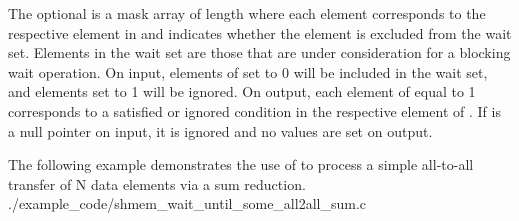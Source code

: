 \begin{apidefinition}
{    The optional  is a mask array of length  where each
    element corresponds to the respective element in  and indicates
    whether the element is excluded from the wait set.  Elements in the wait
    set are those that are under consideration for a blocking wait operation.
    On input, elements of  set to 0 will be included in the wait
    set, and elements set to 1 will be ignored.  On output, each element of
     equal to 1 corresponds to a satisfied or ignored condition in
    the respective element of .  If  is a null pointer
    on input, it is ignored and no values are set on output.
}






\begin{apiexamples}
  \apicexample
      {The following \CorCpp{} example demonstrates the use of 
       to process a simple all-to-all transfer
      of N data elements via a sum reduction.}
      {./example_code/shmem_wait_until_some_all2all_sum.c}
      {}

\end{apiexamples}

\end{apidefinition}
